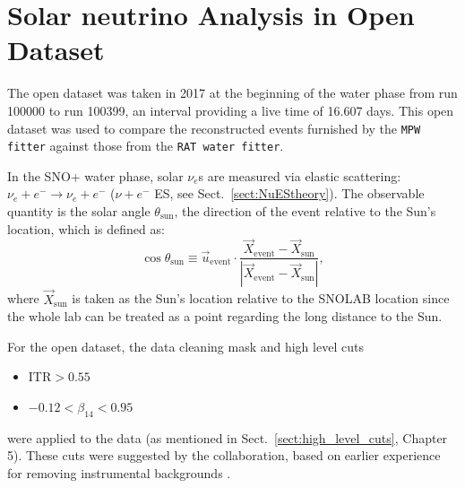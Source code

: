 \section{Solar neutrino Analysis in Open Dataset}

The open dataset was taken in 2017 at the beginning of the water phase from run 100000 to run 100399, an interval providing a live time of 16.607 days.
This open dataset was used to compare the reconstructed events furnished by the \texttt{MPW fitter} against those from the \texttt{RAT water fitter}.

In the SNO+ water phase, solar $\nu_e$s are measured via elastic scattering: $\nu_e+e^-\to \nu_e+e^-$ ($\nu+e^-$ ES, see Sect.~\ref{sect:NuEStheory}). The observable quantity is the solar angle $\theta_\mathrm{sun}$, the direction of the event relative to the Sun's location, which is defined as:
\begin{equation}
\cos\theta_\mathrm{sun}\equiv \vec u_\mathrm{event}\cdot \frac{\vec{X}_\mathrm{event}-\vec{X}_\mathrm{sun}}{|\vec{X}_\mathrm{event}-\vec{X}_\mathrm{sun}|},
\end{equation}
where $\vec{X}_\mathrm{sun}$ is taken as the Sun's location relative to the SNOLAB location since the whole lab can be treated as a point regarding the long distance to the Sun. 

For the open dataset, the data cleaning mask and high level cuts
\begin{itemize}
    \item ITR$>0.55$
    \item $-0.12<\beta_{14}<0.95$
\end{itemize}
were applied to the data (as mentioned in Sect.~\ref{sect:high_level_cuts}, Chapter 5). These cuts were suggested by the collaboration, based on earlier experience for removing instrumental backgrounds \cite{waterunidoc}. 


